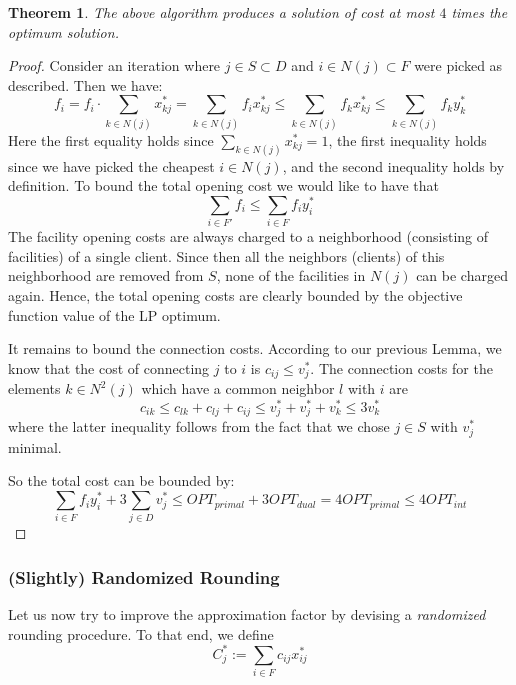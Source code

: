 \documentclass{article}
\newtheorem{theorem}{Theorem}
\begin{document}
\begin{theorem}
The above algorithm produces a solution of cost at most $4$ times the optimum solution.
\end{theorem}
\begin{proof}
Consider an iteration where $j\in S\subset D$ and $i\in N(j)\subset F$ were picked as described. Then we have:
\[
	f_i=f_i\cdot \sum_{k\in N(j)}x^*_{kj}= \sum_{k\in N(j)}f_i x^*_{kj} \leq \sum_{k\in N(j)}f_k x^*_{kj}\leq \sum_{k\in N(j)} f_k y^*_k
\]
Here the first equality holds since $\sum_{k\in N(j)}x^*_{kj}=1$, the first inequality holds since we have picked the cheapest $i\in N(j)$, and the second inequality holds by definition. To bound the total opening cost we would like to have that
\[
	\sum_{i\in F'} f_i \leq \sum_{i\in F}f_iy_i^*
\]
The facility opening costs are always charged to a neighborhood (consisting of facilities) of a single client. Since then all the neighbors (clients) of this neighborhood are removed from $S$, none of the facilities in $N(j)$ can be charged again. Hence, the total opening costs are clearly bounded by the objective function value of the LP optimum.

It remains to bound the connection costs. According to our previous Lemma, we know that the cost of connecting $j$ to $i$ is $c_{ij}\leq v^*_j$. The connection costs for the elements $k\in N^2(j)$ which have a common neighbor $l$ with $i$ are
\[
	c_{ik}\leq c_{lk}+ c_{lj} + c_{ij} \leq v^*_j+v^*_j+v^*_k\leq 3 v^*_k
\]
where the latter inequality follows from the fact that we chose $j\in S$ with $v^*_j$ minimal.

So the total cost can be bounded by:
\[
	\sum_{i\in F} f_iy^*_i + 3\sum_{j\in D}v^*_j \leq OPT_{primal}+ 3 OPT_{dual}=4 OPT_{primal}\leq 4 OPT_{int}
\]
\end{proof}

\subsubsection{(Slightly) Randomized Rounding}
Let us now try to improve the approximation factor by devising a \emph{randomized} rounding procedure. To that end, we define
\[
	C^*_j:=\sum_{i\in F}c_{ij}x^*_{ij}
\]
\end{document}
